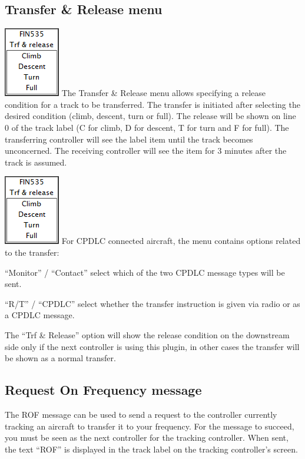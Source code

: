 \documentclass[11pt,a4paper]{memoir}
\newenvironment{Warn}
  {\begin{shaded}\marginnote{\fbox{Warning}}}
  {\end{shaded}}
\begin{document}
\subsection{Transfer \& Release menu}
\label{menu:xfrrel}
\includegraphics{img/xfrrel.png}
The Transfer \& Release menu allows specifying a release condition for a track to be
transferred. The transfer is initiated after selecting the desired condition (climb, descent,
turn or full). The release will be shown on line 0 of the track label (C for climb, D for
descent, T for turn and F for full). The transferring controller will see the label item until
the track becomes unconcerned. The receiving controller will see the item for 3 minutes
after the track is assumed.

\includegraphics{img/xfrrel.png}
For CPDLC connected aircraft, the menu contains options related to the transfer:

“Monitor” / “Contact” select which of the two CPDLC message types will be sent.

“R/T” / “CPDLC” select whether the transfer instruction is given via radio or as a CPDLC
message.

\begin{Warn}
The “Trf \& Release” option will show the release condition on the downstream side only if the
next controller is using this plugin, in other cases the transfer will be shown as a normal transfer.
\end{Warn}

\subsection{Request On Frequency message}
\label{menu:rof}

The ROF message can be used to send a request to the controller currently tracking an aircraft to transfer it
to your frequency. For the message to succeed, you must be seen as the next controller for the tracking
controller. When sent, the text “ROF” is displayed in the track label on the tracking controller’s screen.
\end{document}

